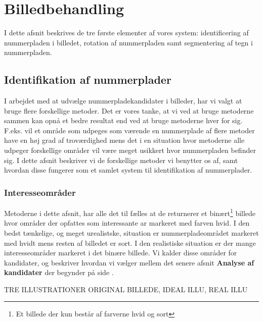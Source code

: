 \section{Billedbehandling}
\label{sec_billed}


I dette afsnit beskrives de tre første elementer af vores system: identificering af nummerpladen i billedet, rotation af nummerpladen samt segmentering af tegn i nummerpladen.


\subsection{Identifikation af nummerplader}
I arbejdet med at udvælge nummerpladekandidater i billeder, har vi valgt at bruge flere forskellige metoder. Det er vores tanke, at vi ved at bruge metoderne sammen kan opnå et bedre resultat end ved at bruge metoderne hver for sig. F.eks. vil et område som udpeges som værende en nummerplade af flere metoder have en høj grad af troværdighed mens det i en situation hvor metoderne alle udpeger forskellige områder vil være meget usikkert hvor nummerpladen befinder sig. I dette afsnit beskriver vi de forskellige metoder vi benytter os af, samt hvordan disse fungerer som et samlet system til identifikation af nummerplader. 


\subsubsection*{Interesseområder}
Metoderne i dette afsnit, har alle det til fælles at de returnerer et binært\footnote{Et billede der kun består af farverne hvid og sort} billede hvor områder der opfattes som interessante ar markeret med farven hvid. I den bedst tænkelige, og meget urealistske, situation er nummerpladeområdet markeret med hvidt mens resten af billedet er sort. I den realistiske situation er der mange interesseområder markeret i det binære billede. Vi kalder disse områder for kandidater, og beskriver hvordan vi vælger mellem det senere afsnit \textbf{Analyse af kandidater} der begynder på side \pageref{sec_kandidater}.

TRE ILLUSTRATIONER ORIGINAL BILLEDE, IDEAL ILLU, REAL ILLU




